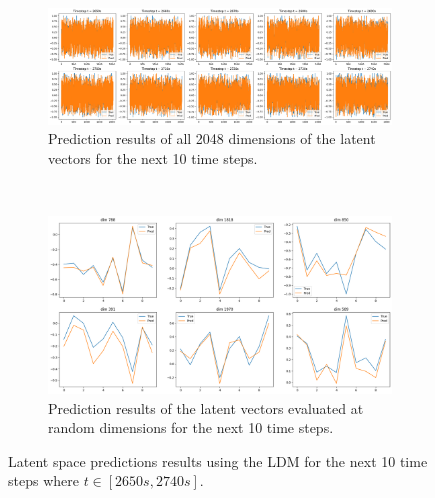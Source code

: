 \documentclass[final-report]{article-template}
\begin{document}
\begin{figure}[!htb]
    \centering
    \begin{subfigure}[t]{\textwidth}
        \centering
        \includegraphics[width=\textwidth]{figures/latent_results.png}
        \caption{Prediction results of all 2048 dimensions of the latent vectors for the next 10 time steps.}
    \end{subfigure} \\[8mm]
    \begin{subfigure}[t]{0.7\textwidth}
        \centering
        \includegraphics[width=\textwidth]{figures/latent_random_dim.png}
        \caption{Prediction results of the latent vectors evaluated at random dimensions for the next 10 time steps.}
    \end{subfigure} 
    \caption{Latent space predictions results using the LDM for the next 10 time steps where $t \in [2650s, 2740s]$.}
    \label{fig:preds_latent}
\end{figure}
\end{document}
